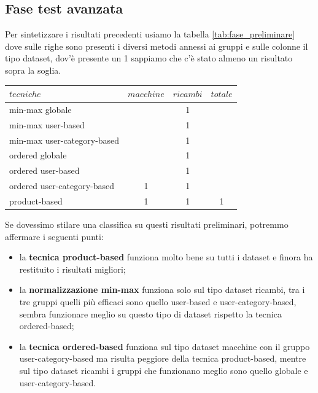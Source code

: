 \subsection{Fase test avanzata}
Per sintetizzare i risultati precedenti usiamo la tabella \ref{tab:fase_preliminare} dove sulle righe sono presenti i diversi metodi annessi ai gruppi e sulle colonne il tipo dataset, dov'è presente un 1 sappiamo che c'è stato almeno un risultato sopra la soglia.
\begin{center}
    \begin{tabular}{|l|ccc|}
        \toprule
        $tecniche$  & $macchine$ & $ricambi$ & $totale$   \\
        \midrule
        min-max globale             &   & 1 &   \\
        min-max user-based          &   & 1 &   \\
        min-max user-category-based &   & 1 &   \\
        \bottomrule
        ordered globale             &   & 1 &   \\
        ordered user-based          &   & 1 &   \\
        ordered user-category-based & 1 & 1 &   \\
        \bottomrule
        product-based               & 1 & 1 & 1  \\
        \bottomrule
    \end{tabular}
    \label{tab:fase_preliminare}
\end{center}
Se dovessimo stilare una classifica su questi risultati preliminari, potremmo affermare i seguenti punti:
\begin{itemize}
    \item la \textbf{tecnica product-based} funziona molto bene su tutti i dataset e finora ha restituito i risultati migliori;
    \item la \textbf{normalizzazione min-max} funziona solo sul tipo dataset ricambi, tra i tre gruppi quelli più efficaci sono quello user-based e user-category-based, sembra funzionare meglio su questo tipo di dataset rispetto la tecnica ordered-based;
    \item la \textbf{tecnica ordered-based} funziona sul tipo dataset macchine con il gruppo user-category-based ma risulta peggiore della tecnica product-based, mentre sul tipo dataset ricambi i gruppi che funzionano meglio sono quello globale e user-category-based.
\end{itemize}

